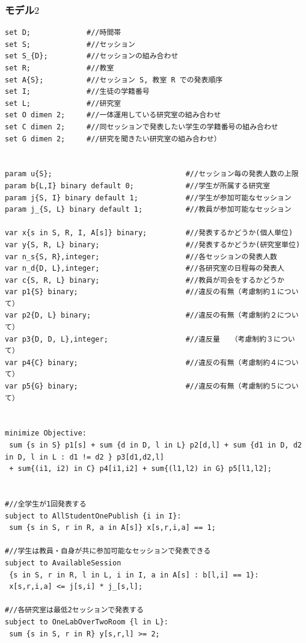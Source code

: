 \documentclass[a4paper,12pt,fleqn]{jarticle}
\begin{document}
\subsubsection{モデル$2$}
\begin{verbatim}
set D;             #//時間帯
set S;             #//セッション
set S_{D};         #//セッションの組み合わせ
set R;             #//教室
set A{S};          #//セッション S, 教室 R での発表順序
set I;             #//生徒の学籍番号
set L;             #//研究室 
set O dimen 2;     #//一体運用している研究室の組み合わせ 
set C dimen 2;     #//同セッションで発表したい学生の学籍番号の組み合わせ 
set G dimen 2;     #//研究を聞きたい研究室の組み合わせ）


param u{S};                               #//セッション毎の発表人数の上限
param b{L,I} binary default 0;            #//学生が所属する研究室
param j{S, I} binary default 1;           #//学生が参加可能なセッション
param j_{S, L} binary default 1;          #//教員が参加可能なセッション

var x{s in S, R, I, A[s]} binary;         #//発表するかどうか(個人単位)
var y{S, R, L} binary;                    #//発表するかどうか(研究室単位)
var n_s{S, R},integer;                    #//各セッションの発表人数
var n_d{D, L},integer;                    #//各研究室の日程毎の発表人
var c{S, R, L} binary;                    #//教員が司会をするかどうか
var p1{S} binary;                         #//違反の有無（考慮制約１について）
var p2{D, L} binary;                      #//違反の有無（考慮制約２について）
var p3{D, D, L},integer;                  #//違反量　　（考慮制約３について）
var p4{C} binary;                         #//違反の有無（考慮制約４について）
var p5{G} binary;                         #//違反の有無（考慮制約５について）


minimize Objective:
 sum {s in S} p1[s] + sum {d in D, l in L} p2[d,l] + sum {d1 in D, d2 in D, l in L : d1 != d2 } p3[d1,d2,l]
 + sum{(i1, i2) in C} p4[i1,i2] + sum{(l1,l2) in G} p5[l1,l2];


#//全学生が1回発表する
subject to AllStudentOnePublish {i in I}:
 sum {s in S, r in R, a in A[s]} x[s,r,i,a] == 1;

#//学生は教員・自身が共に参加可能なセッションで発表できる
subject to AvailableSession
 {s in S, r in R, l in L, i in I, a in A[s] : b[l,i] == 1}:
 x[s,r,i,a] <= j[s,i] * j_[s,l];

#//各研究室は最低2セッションで発表する
subject to OneLabOverTwoRoom {l in L}:
 sum {s in S, r in R} y[s,r,l] >= 2;


\end{verbatim}
\end{document}
